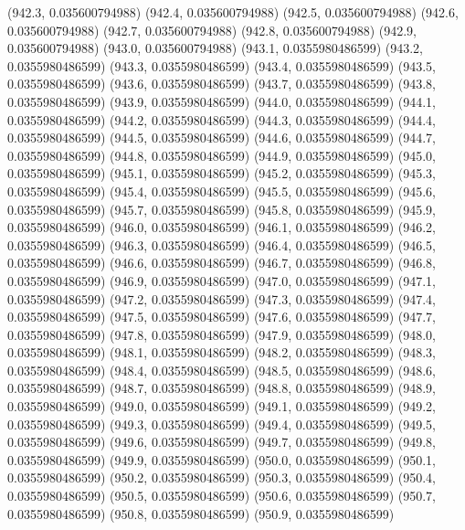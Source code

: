 {					(942.3, 0.035600794988)
					(942.4, 0.035600794988)
					(942.5, 0.035600794988)
					(942.6, 0.035600794988)
					(942.7, 0.035600794988)
					(942.8, 0.035600794988)
					(942.9, 0.035600794988)
					(943.0, 0.035600794988)
					(943.1, 0.0355980486599)
					(943.2, 0.0355980486599)
					(943.3, 0.0355980486599)
					(943.4, 0.0355980486599)
					(943.5, 0.0355980486599)
					(943.6, 0.0355980486599)
					(943.7, 0.0355980486599)
					(943.8, 0.0355980486599)
					(943.9, 0.0355980486599)
					(944.0, 0.0355980486599)
					(944.1, 0.0355980486599)
					(944.2, 0.0355980486599)
					(944.3, 0.0355980486599)
					(944.4, 0.0355980486599)
					(944.5, 0.0355980486599)
					(944.6, 0.0355980486599)
					(944.7, 0.0355980486599)
					(944.8, 0.0355980486599)
					(944.9, 0.0355980486599)
					(945.0, 0.0355980486599)
					(945.1, 0.0355980486599)
					(945.2, 0.0355980486599)
					(945.3, 0.0355980486599)
					(945.4, 0.0355980486599)
					(945.5, 0.0355980486599)
					(945.6, 0.0355980486599)
					(945.7, 0.0355980486599)
					(945.8, 0.0355980486599)
					(945.9, 0.0355980486599)
					(946.0, 0.0355980486599)
					(946.1, 0.0355980486599)
					(946.2, 0.0355980486599)
					(946.3, 0.0355980486599)
					(946.4, 0.0355980486599)
					(946.5, 0.0355980486599)
					(946.6, 0.0355980486599)
					(946.7, 0.0355980486599)
					(946.8, 0.0355980486599)
					(946.9, 0.0355980486599)
					(947.0, 0.0355980486599)
					(947.1, 0.0355980486599)
					(947.2, 0.0355980486599)
					(947.3, 0.0355980486599)
					(947.4, 0.0355980486599)
					(947.5, 0.0355980486599)
					(947.6, 0.0355980486599)
					(947.7, 0.0355980486599)
					(947.8, 0.0355980486599)
					(947.9, 0.0355980486599)
					(948.0, 0.0355980486599)
					(948.1, 0.0355980486599)
					(948.2, 0.0355980486599)
					(948.3, 0.0355980486599)
					(948.4, 0.0355980486599)
					(948.5, 0.0355980486599)
					(948.6, 0.0355980486599)
					(948.7, 0.0355980486599)
					(948.8, 0.0355980486599)
					(948.9, 0.0355980486599)
					(949.0, 0.0355980486599)
					(949.1, 0.0355980486599)
					(949.2, 0.0355980486599)
					(949.3, 0.0355980486599)
					(949.4, 0.0355980486599)
					(949.5, 0.0355980486599)
					(949.6, 0.0355980486599)
					(949.7, 0.0355980486599)
					(949.8, 0.0355980486599)
					(949.9, 0.0355980486599)
					(950.0, 0.0355980486599)
					(950.1, 0.0355980486599)
					(950.2, 0.0355980486599)
					(950.3, 0.0355980486599)
					(950.4, 0.0355980486599)
					(950.5, 0.0355980486599)
					(950.6, 0.0355980486599)
					(950.7, 0.0355980486599)
					(950.8, 0.0355980486599)
					(950.9, 0.0355980486599)
}
